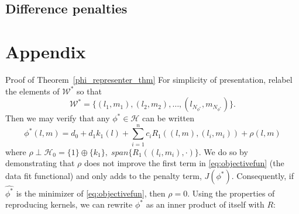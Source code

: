 \documentclass[12pt]{article}
\theoremstyle{definition}
\begin{document}
\subsection{Difference penalties}






\section{Appendix}


Proof of Theorem~\ref{phi_representer_thm}
 For simplicity of presentation, relabel the elements of $\mathcal{W}^*$ so that 
\[
\mathcal{W}^* = \lbrace \left( l_1,m_1 \right), \left( l_2,m_2 \right), \dots, \left( l_{N_{\phi^*}},m_{N_{\phi^*}} \right)  \rbrace.
\]
Then we may verify that any $\phi^* \in \mathcal{H}$ can be written 
\[
\phi^*\left(l,m \right) = d_0 + d_1k_1\left(l\right) + \sum_{i=1}^n  c_i R_1\left( \left(l,m\right) , \left(l_i,m_i \right)\right) + \rho\left(l,m\right)
\]
\noindent
where $\rho \perp \mathcal{H}_0 = \lbrace 1\rbrace \oplus \lbrace k_1\rbrace,\; span\lbrace R_1\left(\left(l_i, m_i \right),\cdot \right)  \rbrace$. We do so by demonstrating that  $\rho$ does not improve the first term in \eqref{eq:objectivefun} (the data fit functional) and only adds to the penalty term, $J\left(\phi^*\right)$. Consequently, if $\hat{\phi^*}$ is the minimizer of \eqref{eq:objectivefun}, then $\rho = 0$. Using the properties of reproducing kernels, we can rewrite $\phi^*$ as an inner product of itself with $R$:
 
\end{document}
